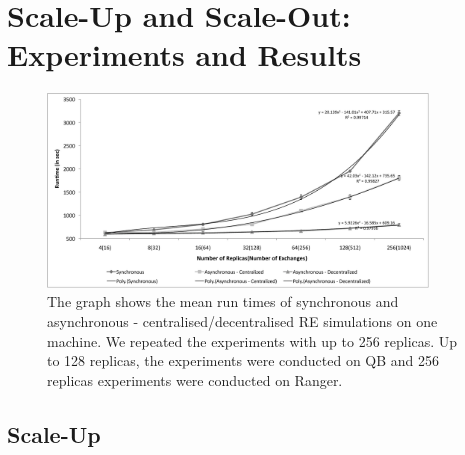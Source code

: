 \documentclass{rspublic}
\begin{document}
\section{Scale-Up and Scale-Out: Experiments and Results}

%
\begin{figure}
\centering
\includegraphics[width=0.9\textwidth]{scale_up.pdf}
\caption{\small The graph shows the mean run times of synchronous and asynchronous - centralised/decentralised RE simulations on one machine. We repeated the experiments with up to 256 replicas. Up to 128 replicas, the experiments were conducted on QB and 256 replicas experiments were conducted on Ranger.}
\label{fig:graph}
\vspace{-1em}
\end{figure}




\subsection{Scale-Up}
\end{document}
